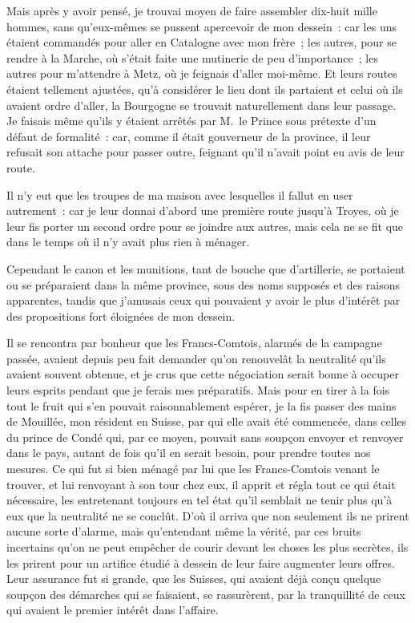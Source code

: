 \documentclass[french,twoside]{book} %
\begin{document}
Mais après y avoir pensé, je trouvai moyen de faire assembler dix-huit mille hommes, sans qu’eux-mêmes se pussent apercevoir de mon dessein : car les uns étaient commandés pour aller en Catalogne avec mon frère ; les autres, pour se rendre à la Marche, où s’était faite une mutinerie de peu d’importance ; les autres pour m’attendre à Metz, où je feignais d’aller moi-même. Et leurs routes étaient tellement ajustées, qu’à considérer le lieu dont ils partaient et celui où ils avaient ordre d’aller, la Bourgogne se trouvait naturellement dans leur passage. Je faisais même qu’ils y étaient arrêtés par M. le Prince sous prétexte d’un défaut de formalité : car, comme il était gouverneur de la province, il leur refusait son attache pour passer outre, feignant qu’il n’avait point eu avis de leur route.\par
Il n’y eut que les troupes de ma maison avec lesquelles il fallut en user autrement : car je leur donnai d’abord une première route jusqu’à Troyes, où je leur fis porter un second ordre pour se joindre aux autres, mais cela ne se fit que dans le temps où il n’y avait plus rien à ménager.\par
Cependant le canon et les munitions, tant de bouche que d’artillerie, se portaient ou se préparaient dans la même province, sous des noms supposés et des raisons apparentes, tandis que j’amusais ceux qui pouvaient y avoir le plus d’intérêt par des propositions fort éloignées de mon dessein.\par
Il se rencontra par bonheur que les Francs-Comtois, alarmés de la campagne passée, avaient depuis peu fait demander qu’on renouvelât la neutralité qu’ils avaient souvent obtenue, et je crus que cette négociation serait bonne à occuper leurs esprits pendant que je ferais mes préparatifs. Mais pour en tirer à la fois tout le fruit qui s’en pouvait raisonnablement espérer, je la fis passer des mains de Mouillée, mon résident en Suisse, par qui elle avait été commencée, dans celles du prince de Condé qui, par ce moyen, pouvait sans soupçon envoyer et renvoyer dans le pays, autant de fois qu’il en serait besoin, pour prendre toutes nos mesures. Ce qui fut si bien ménagé par lui que les Francs-Comtois venant le trouver, et lui renvoyant à son tour chez eux, il apprit et régla tout ce qui était nécessaire, les entretenant toujours en tel état qu’il semblait ne tenir plus qu’à eux que la neutralité ne se conclût. D’où il arriva que non seulement ils ne prirent aucune sorte d’alarme, mais qu’entendant même la vérité, par ces bruits incertains qu’on ne peut empêcher de courir devant les choses les plus secrètes, ils les prirent pour un artifice étudié à dessein de leur faire augmenter leurs offres. Leur assurance fut si grande, que les Suisses, qui avaient déjà conçu quelque soupçon des démarches qui se faisaient, se rassurèrent, par la tranquillité de ceux qui avaient le premier intérêt dans l’affaire.\par
\end{document}
